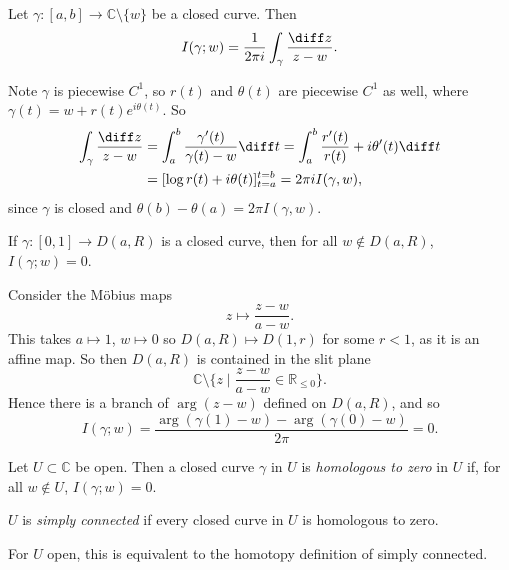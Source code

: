 \documentclass[12pt]{article}
\begin{document}
\begin{lemma}
	Let $\gamma : [a, b] \to \mathbb{C} \setminus \{w\}$ be a closed curve. Then
	\[
	I(\gamma; w) = \frac{1}{2 \pi i} \int_{\gamma} \frac{\diff z}{z - w}
	.\]
\end{lemma}

\begin{proofbox}
	Note $\gamma$ is piecewise $C^{1}$, so $r(t)$ and $\theta(t)$ are piecewise $C^{1}$ as well, where $\gamma(t) = w + r(t) e^{i \theta(t)}$. So
	\begin{align*}
		\int_{\gamma} \frac{\diff z}{z - w} &= \int_{a}^{b} \frac{\gamma'(t)}{\gamma(t) - w} \diff t = \int_{a}^{b} \frac{r'(t)}{r(t)} + i \theta'(t) \diff t \\
						    &= [\log r(t) + i \theta(t)]_{t = a}^{t = b} = 2 \pi i I(\gamma, w),
	\end{align*}
	since $\gamma$ is closed and $\theta(b) - \theta(a) = 2 \pi I(\gamma, w)$.
\end{proofbox}

\begin{proposition}
	If $\gamma : [0, 1] \to D(a, R)$ is a closed curve, then for all $w \not \in D(a, R)$, $I(\gamma; w) = 0$.
\end{proposition}

\begin{proofbox}
	Consider the M\"{o}bius maps
	\[
	z \mapsto \frac{z - w}{a - w}
	.\]
	This takes $a \mapsto 1$, $w \mapsto 0$ so $D(a, R) \mapsto D(1, r)$ for some $r < 1$, as it is an affine map. So then $D(a, R)$ is contained in the slit plane
	\[
		\mathbb{C} \setminus \{z \mid \frac{z - w}{a - w} \in \mathbb{R}_{\leq 0} \}
	.\]
	Hence there is a branch of $\arg(z - w)$ defined on $D(a, R)$, and so
	\[
	I(\gamma; w) = \frac{\arg(\gamma(1) - w) - \arg(\gamma(0) - w)}{2 \pi} = 0
	.\]
\end{proofbox}

\begin{definition}
	Let $U \subset \mathbb{C}$ be open. Then a closed curve $\gamma$ in $U$ is \emph{homologous to zero} in $U$ if, for all $w \not \in U$, $I(\gamma; w) = 0$.

	$U$ is \emph{simply connected} if every closed curve in $U$ is homologous to zero.
\end{definition}

\begin{remark}
	For $U$ open, this is equivalent to the homotopy definition of simply connected.
\end{remark}
\end{document}
